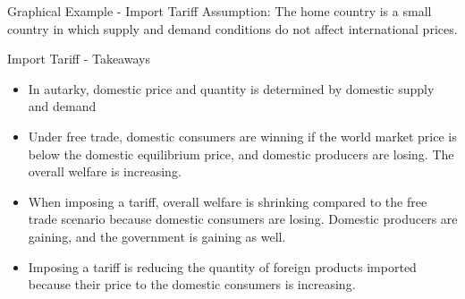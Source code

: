 \documentclass{beamer}
\begin{document}
\begin{frame}[t]{Graphical Example - Import Tariff}
\small
    Assumption: The home country is a small country in which supply and demand conditions do not affect international prices.
   
\end{frame}

\begin{frame}{Import Tariff - Takeaways}
\small
    \begin{itemize}
    \item In autarky, domestic price and quantity is determined by domestic supply and demand
    \item Under free trade, domestic consumers are winning if the world market price is below the domestic equilibrium price, and domestic producers are losing. The overall welfare is increasing.
    \item When imposing a tariff, overall welfare is shrinking compared to the free trade scenario because domestic consumers are losing. Domestic producers are gaining, and the government is gaining as well. 
    \item Imposing a tariff is reducing the quantity of foreign products imported because their price to the domestic consumers is increasing.
    \end{itemize}
\end{frame}
\end{document}
